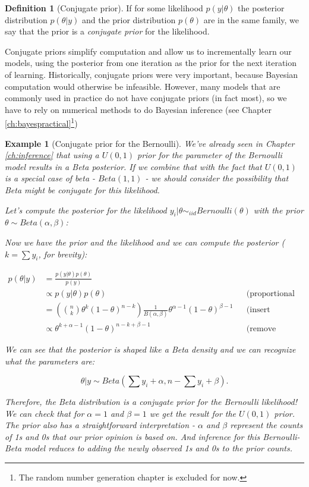 \documentclass{book}
\theoremstyle{plain}%
\newtheorem{prototheorem}{Example}[section]
\newenvironment{cexample}
   {\colorlet{shadecolor}{gray!10}\begin{shaded}\begin{prototheorem}}
   {\end{prototheorem}\end{shaded}}
\theoremstyle{definition}
\newtheorem{definition}{Definition}[section]
\begin{document}
\begin{definition}[Conjugate prior] If for some likelihood $p(y|\theta)$ the posterior distribution $p(\theta | y)$ and the prior distribution $p(\theta)$ are in the same family, we say that the prior is a \emph{conjugate prior} for the likelihood.
\end{definition}

Conjugate priors simplify computation and allow us to incrementally learn our models, using the posterior from one iteration as the prior for the next iteration of learning. Historically, conjugate priors were very important, because Bayesian computation would otherwise be infeasible. However, many models that are commonly used in practice do not have conjugate priors (in fact most), so we have to rely on numerical methods to do Bayesian inference (see Chapter \ref{ch:bayespractical}\footnote{The random number generation chapter is excluded for now.})

\begin{cexample}[Conjugate prior for the Bernoulli] We've already seen in Chapter \ref{ch:inference} that using a $U(0,1)$ prior for the parameter of the Bernoulli model results in a Beta posterior. If we combine that with the fact that $U(0,1)$ is a special case of beta - $Beta(1, 1)$ - we should consider the possibility that Beta might be conjugate for this likelihood.

Let's compute the posterior for the likelihood $y_i | \theta \sim_{iid} Bernoulli(\theta)$ with the prior $\theta \sim Beta(\alpha, \beta)$:


Now we have the prior and the likelihood and we can compute the posterior ($k = \sum y_i$, for brevity):

\begin{align*}
p(\theta|y) &= \frac{p(y|\theta)p(\theta)}{p(y)} \\
&\propto p(y|\theta)p(\theta) && \text{(proportional to)} \\
&=  \left({n \choose k} \theta^{k}(1 -\theta)^{n - k}\right)\frac{1}{B(\alpha, \beta)} \theta^{\alpha - 1}(1-\theta)^{\beta - 1}  && \text{(insert densities)}\\
&\propto \theta^{k + \alpha - 1}(1-\theta)^{n - k + \beta - 1} && \text{(remove constants)}
\end{align*}

We can see that the posterior is shaped like a Beta density and we can recognize what the parameters are:

$$\theta | y \sim Beta(\sum y_i + \alpha, n - \sum y_i + \beta).$$

Therefore, the Beta distribution is a conjugate prior for the Bernoulli likelihood! We can check that for $\alpha = 1$ and $\beta = 1$ we get the result for the $U(0,1)$ prior. The prior also has a straightforward interpretation - $\alpha$ and $\beta$ represent the counts of 1s and 0s that our prior opinion is based on. And inference for this Bernoulli-Beta model reduces to adding the newly observed 1s and 0s to the prior counts.
\end{cexample}
\end{document}
